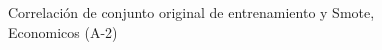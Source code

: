 \begin{figure}[H]
    \centering
    
    \caption{Correlación de conjunto original de entrenamiento y Smote, Economicos (A-2)}
    \label{pairwise-economicos-a-2-smote-enc}
\end{figure}
